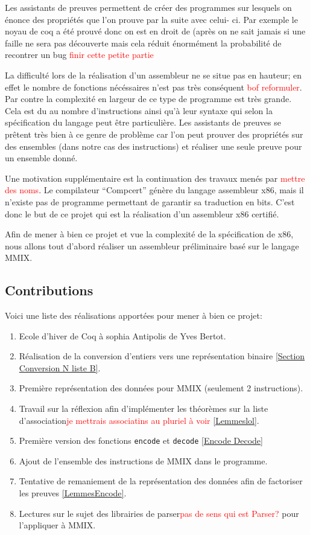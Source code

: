 \documentclass {article}
\theoremstyle{definition}
\theoremstyle{remark}
\newcommand{\todo}[1]{\textcolor{red}{#1}}
\newcommand{\fun}[1]{\lstinline!#1!}
\begin{document}
Les assistants de preuves permettent de créer des programmes sur lesquels on énonce des propriétés que l'on prouve par
la suite avec celui- ci. 
Par exemple le noyau de coq a été prouvé donc on est en droit de (après on ne sait jamais si une faille ne sera pas découverte
mais cela réduit énormément la probabilité de recontrer un bug \todo{finir cette petite partie}

La difficulté lors de la réalisation d'un assembleur ne se situe pas en hauteur; en effet le nombre de
fonctions nécéssaires n'est pas très conséquent \todo{bof reformuler}. Par contre la complexité en largeur
de ce type de programme est très grande. Cela est du au nombre d'instructions ainsi qu'à leur syntaxe qui selon
la spécification du langage peut être particulière.
Les assistants de preuves se prêtent très bien à ce genre de problème car l'on peut prouver des
propriétés sur des ensembles (dans notre cas des instructions) et réaliser une seule preuve pour
un ensemble donné.

Une motivation supplémentaire est la continuation des travaux menés par \todo{mettre des noms}.
Le compilateur ``Compcert'' génère du langage assembleur x86, mais il n'existe pas
de programme permettant de garantir sa traduction en bits.
C'est donc le but de ce projet qui est la réalisation d'un assembleur x86 certifié.

Afin de mener à bien ce projet et vue la complexité de la spécification de x86,
nous allons tout d'abord réaliser un assembleur préliminaire basé sur le langage MMIX.



\subsection{Contributions}
Voici une liste des réalisations apportées pour mener à bien ce projet:
\begin{enumerate}
\item Ecole d'hiver de Coq à sophia Antipolis de Yves Bertot.
\item Réalisation de la conversion d'entiers vers une représentation binaire \ref{Section Conversion N liste B}.
\item Première représentation des données pour MMIX (seulement 2 instructions).
\item Travail sur la réflexion afin d'implémenter les théorèmes sur la liste d'association\todo{je mettrais associatins au pluriel à voir} \ref{Lemmeslol}.
\item Première version des fonctions \fun{encode} et \fun{decode} \ref{Encode Decode}
\item Ajout de l'ensemble des instructions de MMIX dans le programme.
\item Tentative de remaniement de la représentation des données afin de factoriser les preuves \ref{LemmesEncode}.
\item Lectures sur le sujet des librairies de parser\todo{pas de sens qui est Parser?} pour l'appliquer à MMIX.
\end{enumerate}
\end{document}
